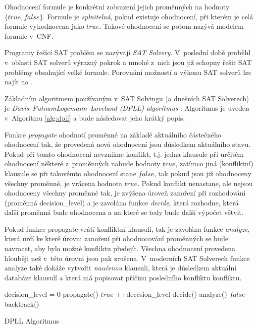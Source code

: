 \documentclass[a4paper, 12pt]{article}
\begin{document}
Ohodnocení formule je konkrétní zobrazení jejich proměnných na hodnoty $\{true, false\}$.
Formule je \emph{splnitelná}, pokud existuje ohodnocení, při kterém je celá formule vyhodnocena
jako $true$.
Takové ohodnocení se potom nazývá modelem formule v~CNF.

Programy řešící SAT problém se nazývají \emph{SAT Solvery}.
V~poslední době proběhl v~oblasti SAT solverů výrazný pokrok a mnohé z~nich jsou již
schopny  řešit SAT problémy obsahující velké formule.
Porovnání možností a výkonu SAT solverů lze najít na \cite{www:sat}.

Základním algoritmem používaným v~SAT Solvingu (a dnešních SAT Solverech) je
\emph{Davis–Putnam\-Logemann–Loveland (DPLL) algoritmus} \cite{dpll:1960, dpll:1962}.
Algoritmus je uveden v~Algoritmu \ref{alg:dpll} a bude následovat jeho krátký popis.

Funkce \emph{propagate} ohodnotí proměnné na základě aktuálního částečného ohodnocení tak, že
provedená nová ohodnocení jsou důsledkem aktuálního stavu.
Pokud při tomto ohodnocení nevznikne konflikt, t.j. jedna klausule při určitém ohodnocení některé z~proměnných nabude hodnoty $true$,
zatímco jiná (konfliktní) klausule se při takovémto ohodnocení stane $false$, tak pokud jsou již ohodnoceny všechny proměnné, je vrácena
hodnota $true$.
Pokud konflikt nenastane, ale nejsou ohodnoceny všechny proměnné tak, je zvýšena úroveň zanoření při rozhodování (proměnná decision\_level)
a je zavolána funkce \emph{decide}, která rozhodne, která další proměnná bude ohodnocena a na které se tedy bude další výpočet větvit.

Pokud funkce propagate vrátí konfliktní klausuli, tak je zavolána funkce \emph{analyze}, která určí ke které úrovni zanoření při ohodnocování
proměnných se bude navracet, aby bylo možné konfliktu předejít.
Všechna ohodnocení provedena hlouběji než v~této úrovni jsou pak zrušena.
V~moderních SAT Solverech funkce analyze také dokáže vytvořit \emph{naučenou} klausuli, která je důsledkem aktuální databáze klausulí a která
má popisovat příčinu posledního konfliktu konfliktu.

\begin{algorithm}
\label{alg:dpll}
    decision\_level = 0\;
    {
        propagate()\;
        {
            {
                \Return $true$\;
            }
            {
                ++decesion\_level\;
                decide()\;
            }
        }
        {
            analyze()\;
            {
                \Return $false$\;
            }
            {
                backtrack()\;
            }
        }
    }
\caption{DPLL Algoritmus}
\end{algorithm}
\end{document}
